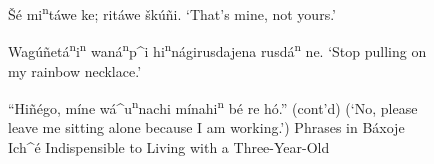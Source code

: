 \documentclass[output=paper]{LSP/langsci}
\begin{document}
\begin{figure}[p]
\begin{list}{}{}
\item{\v{S}\'e mi\textsuperscript{n}t\'awe ke;  rit\'awe \v{s}k\'u\~ni. `That's mine, not yours.'}
\item{Wag\'u\~net\'a\textsuperscript{n}i\textsuperscript{n} wan\'a\textsuperscript{n}p\^{ }i hi\textsuperscript{n}n\'agirusdajena rusd\'a\textsuperscript{n} ne. `Stop pulling on my rainbow necklace.'}
\end{list} 
\caption{``Hi\~n\'ego, m\'ine w\'a\^{ }u\textsuperscript{n}nachi m\'inahi\textsuperscript{n} b\'e re h\'o.'' (cont'd)\newline
(`No, please leave me sitting alone because I am working.')\newline
Phrases in B\'axoje Ich\^{ }\'e Indispensible to Living with a Three-Year-Old}
\label{phraselist3}
\end{figure}
\FloatBarrier
\end{document}
